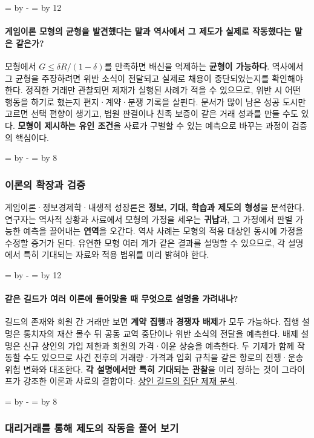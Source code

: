 \documentclass[10pt,a4paper]{article}
\newcommand{\ReserveQuestionSpace}{%
  \par\begingroup
  \dimen0=\pagegoal \advance\dimen0 by -\pagetotal
  \dimen2=\baselineskip \multiply\dimen2 by 12
  \ifdim\dimen0<\dimen2 \newpage\fi
  \endgroup}
\newcommand{\ReserveReadingSectionSpace}{%
  \par\begingroup
  \dimen0=\pagegoal \advance\dimen0 by -\pagetotal
  \dimen2=\baselineskip \multiply\dimen2 by 8
  \ifdim\dimen0<\dimen2 \newpage\fi
  \endgroup}
\begin{document}
\ReserveQuestionSpace
\paragraph{게임이론 모형의 균형을 발견했다는 말과 역사에서 그 제도가 실제로 작동했다는 말은 같은가?}
모형에서 $G\leq\delta R/(1-\delta)$를 만족하면 배신을 억제하는 \textbf{균형이 가능하다}. 역사에서 그 균형을 주장하려면 위반 소식이 전달되고 실제로 채용이 중단되었는지를 확인해야 한다. 정직한 거래만 관찰되면 제재가 실행된 사례가 적을 수 있으므로, 위반 시 어떤 행동을 하기로 했는지 편지·계약·분쟁 기록을 살핀다. 문서가 많이 남은 성공 도시만 고르면 선택 편향이 생기고, 법원 판결이나 친족 보증이 같은 거래 성과를 만들 수도 있다. \textbf{모형이 제시하는 유인 조건}을 사료가 구별할 수 있는 예측으로 바꾸는 과정이 검증의 핵심이다.\par

\ReserveReadingSectionSpace
\subsubsection*{이론의 확장과 검증}

게임이론·정보경제학·내생적 성장론은 \textbf{정보, 기대, 학습과 제도의 형성}을 분석한다. 연구자는 역사적 상황과 사료에서 모형의 가정을 세우는 \textbf{귀납}과, 그 가정에서 판별 가능한 예측을 끌어내는 \textbf{연역}을 오간다. 역사 사례는 모형의 적용 대상인 동시에 가정을 수정할 증거가 된다. 유연한 모형 여러 개가 같은 결과를 설명할 수 있으므로, 각 설명에서 특히 기대되는 자료와 적용 범위를 미리 밝혀야 한다.\par

\ReserveQuestionSpace
\paragraph{같은 길드가 여러 이론에 들어맞을 때 무엇으로 설명을 가려내나?}
길드의 존재와 회원 간 거래만 보면 \textbf{계약 집행}과 \textbf{경쟁자 배제}가 모두 가능하다. 집행 설명은 통치자의 재산 몰수 뒤 공동 교역 중단이나 위반 소식의 전달을 예측한다. 배제 설명은 신규 상인의 가입 제한과 회원의 가격·이윤 상승을 예측한다. 두 기제가 함께 작동할 수도 있으므로 사건 전후의 거래량·가격과 입회 규칙을 같은 항로의 전쟁·운송 위험 변화와 대조한다. \textbf{각 설명에서만 특히 기대되는 관찰}을 미리 정하는 것이 그라이프가 강조한 이론과 사료의 결합이다. \href{https://doi.org/10.1086/261953}{상인 길드의 집단 제재 분석}.\par

\ReserveReadingSectionSpace
\subsubsection*{대리거래를 통해 제도의 작동을 풀어 보기}
\end{document}
